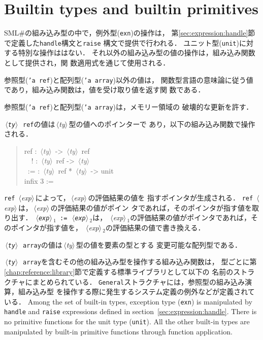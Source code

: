 \documentclass{jbook}
\newcommand{\txt}[2]{#2}
\newcommand{\smlsharp}{SML\#}
\newcommand{\code}[1]{\mbox{\large\tt #1}}
\newcommand{\nonterm}[1]{\mbox{$\,\langle$}{\it #1}\mbox{$\rangle\,$}}
\newcommand{\term}[1]{\mbox{{\tt #1}}}
\newenvironment{program}{\begin{quote}\begin{tt}}%
                        {\end{tt}\end{quote}}
\begin{document}
\section{\txt{組み込み型とその演算}{Builtin types and builtin primitives}}
\label{sec:ref}

\ifjp%
	\smlsharp{}の組み込み型の中で，例外型(\term{exn})の操作は，
第\ref{sec:expression:handle}節で定義した\term{handle}構文と\term{raise}
構文で提供で行われる．
	ユニット型(\term{unit})に対する特別な操作ははない．
	それ以外の組み込み型の値の操作は，組み込み関数として提供され，関
数適用式を通じて使用される．

	参照型(\term{'a ref})と配列型(\term{'a array})以外の値は，
関数型言語の意味論に従う値であり，組み込み関数は，値を受け取り値を返す関
数である．

	参照型(\term{'a ref})と配列型(\term{'a array})は，メモリー領域の
破壊的な更新を許す．

	\code{\nonterm{ty} ref}の値は\nonterm{ty}型の値へのポインターで
あり，以下の組み込み関数で操作される．
\begin{program}
ref : \nonterm{ty} -> \nonterm{ty} ref\\
\ \ ! : \nonterm{ty} ref -> \nonterm{ty}\\
\ :=  : \nonterm{ty} ref * \nonterm{ty}  -> unit\\
infix 3 :=
\end{program}
	\code{ref} \nonterm{exp}によって，\nonterm{exp}の評価結果の値を
指すポインタが生成される．
	\code{ref} \nonterm{exp}は，\nonterm{exp}の評価結果の値がポイン
タであれば，そのポインタが指す値を取り出す．
	\code{\nonterm{exp}$_1$ := \nonterm{exp}$_2$}は，
\nonterm{exp}$_1$の評価結果の値がポインタであれば，そのポインタが指す値を，
\nonterm{exp}$_2$の評価結果の値で書き換える．

	\code{\nonterm{ty} array}の値は\nonterm{ty}型の値を要素の型とする
変更可能な配列型である．
	
	\code{\nonterm{ty} array}を含むその他の組み込み型を操作する組み込み関数は，
型ごとに第\ref{chap:reference:library}節で定義する標準ライブラリとして以下の
名前のストラクチャにまとめられている．
	\term{General}ストラクチャには，参照型の組み込み演算，組み込み型
を操作する際に発生するシステム定義の例外などが定義されている．
\else%
	Among the set of built-in types, exception type (\term{exn}) is 
manipulated by \term{handle} and \term{raise} expressions defined in 
section~\ref{sec:expression:handle}.
	There is no primitive functions for the unit type (\term{unit}).
	All the other built-in types are manipulated by built-in
primitive functions through function application.
\end{document}
